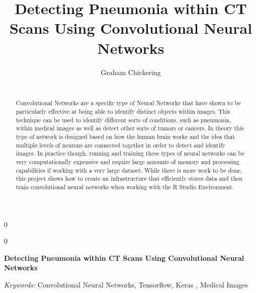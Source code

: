 \documentclass[12pt]{article}
\newcommand{\blind}{0}
\begin{document}
\def\spacingset#1{\renewcommand{\baselinestretch}%
{#1}\small\normalsize} \spacingset{1}



\blind
{
  \title{\bf Detecting Pneumonia within CT Scans Using Convolutional Neural Networks}

  \author{
        Graham Chickering \\
    \\
      }
  \maketitle
} \fi

\blind
{
  \bigskip
  \bigskip
  \bigskip
  \begin{center}
    {\LARGE\bf Detecting Pneumonia within CT Scans Using Convolutional Neural Networks}
  \end{center}
  \medskip
} \fi

\bigskip
\begin{abstract}
Convolutional Networks are a specific type of Neural Networks that have
shown to be particularly effective at being able to identify distinct
objects within images. This technique can be used to identify different
sorts of conditions, such as pneumonia, within medical images as well as
detect other sorts of tumors or cancers. In theory this type of network
is designed based on how the human brain works and the idea that
multiple levels of neurons are connected together in order to detect and
identify images. In practice though, running and training these types of
neural networks can be very computationally expensive and require large
amounts of memory and processing capabilities if working with a very
large dataset. While there is more work to be done, this project shows
how to create an infrastructure that efficiently stores data and then
train convolutional neural networks when working with the R Studio
Environment.
\end{abstract}

\noindent%
{\it Keywords:} Convolutional Neural Networks, Tensorflow, Keras , Medical Images
\vfill

\newpage
\spacingset{1.45} %
\end{document}

